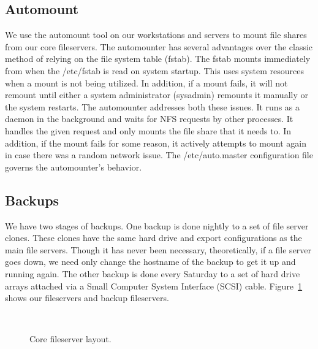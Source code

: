 \subsection{Automount}
We use the automount tool on our workstations and servers to mount file shares from our core fileservers.  The automounter has several advantages over the classic method of relying on the file system table (fstab).  The fstab mounts immediately from when the /etc/fstab is read on system startup.  This uses system resources when a mount is not being utilized.  In addition, if a mount fails, it will not remount until either a system administrator (sysadmin) remounts it manually or the system restarts.  The automounter addresses both these issues.  It runs as a daemon in the background and waits for NFS requests by other processes.  It handles the given request and only mounts the file share that it needs to.  In addition, if the mount fails for some reason, it actively attempts to mount again in case there was a random network issue.  The /etc/auto.master configuration file governs the automounter's behavior.

\subsection{Backups}
We have two stages of backups.  One backup is done nightly to a set of file server clones.  These clones have the same hard drive and export configurations as the main file servers.  Though it has never been necessary, theoretically, if a file server goes down, we need only change the hostname of the backup to get it up and running again.  The other backup is done every Saturday to a set of hard drive arrays attached via a Small Computer System Interface (SCSI) cable.  Figure~\ref{fig:FileserverLayout} shows our fileservers and backup fileservers.

\begin{figure}
  \begin{center}
  \end{center}
  \caption{Core fileserver layout.}
  \label{fig:FileserverLayout}
\
\vskip1pt
\
\vskip1pt
\
\end{figure}


